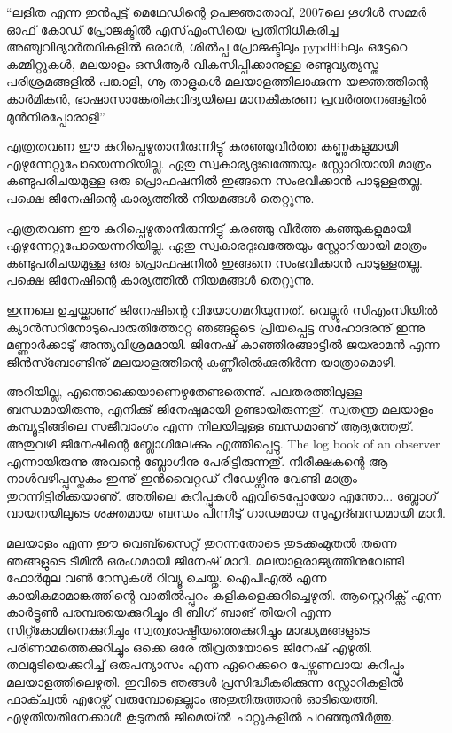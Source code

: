 {\vskip 2pt}

\begin{framed}
``ലളിത എന്ന ഇന്‍പുട്ട് മെഥേഡിന്റെ ഉപജ്ഞാതാവ്, 2007ലെ ഗൂഗിള്‍ സമ്മര്‍ ഓഫ് കോഡ് പ്രോജക്ടില്‍ എസ്എംസിയെ 
പ്രതിനിധീകരിച്ച അഞ്ചുവിദ്യാര്‍ത്ഥികളില്‍ ഒരാള്‍, ശില്‍പ്പ പ്രോജക്ടിലും pypdflibലും ഒട്ടേറെ കമ്മിറ്റുകള്‍, മലയാളം ഒസിആര്‍ 
വികസിപ്പിക്കാനുള്ള രണ്ടുവ്യത്യസ്ത പരിശ്രമങ്ങളില്‍ പങ്കാളി, ഗ്നൂ താളുകള്‍ മലയാളത്തിലാക്കുന്ന യജ്ഞത്തിന്റെ കാര്‍മികന്‍, 
ഭാഷാസാങ്കേതികവിദ്യയിലെ മാനകീകരണ പ്രവര്‍ത്തനങ്ങളില്‍ മുന്‍നിരപ്പോരാളി''
\end{framed}

{\vskip 12pt}

എത്രതവണ ഈ കുറിപ്പെഴുതാനിരുന്നിട്ടു് കരഞ്ഞുവീര്‍ത്ത കണ്ണുകളുമായി എഴുന്നേറ്റുപോയെന്നറിയില്ല. ഏതു സ്വകാര്യദുഃഖത്തേയും 
സ്റ്റോറിയായി മാത്രം കണ്ടുപരിചയമുള്ള ഒരു പ്രൊഫഷനില്‍ ഇങ്ങനെ സംഭവിക്കാന്‍ പാടുള്ളതല്ല. പക്ഷെ ജിനേഷിന്റെ 
കാര്യത്തില്‍ നിയമങ്ങള്‍ തെറ്റുന്നു.

എത്രതവണ ഈ കുറിപ്പെഴുതാനിരുന്നിട്ടു് കരഞ്ഞു വീർത്ത കഞ്ഞുകളുമായി എഴുന്നേറ്റുപോയെന്നറിയില്ല. ഏതു സ്വകാരദുഃഖത്തേയും
സ്റ്റോറിയായി മാത്രം കണ്ടുപരിചയമുള്ള ഒരു പ്രൊഫഷനിൽ ഇങ്ങനെ സംഭവിക്കാൻ പാടുള്ളതല്ല. പക്ഷെ ജിനേഷിന്റെ കാര്യത്തിൽ നിയമങ്ങൾ തെറ്റുന്നു.

ഇന്നലെ ഉച്ചയ്ക്കാണു് ജിനേഷിന്റെ വിയോഗമറിയുന്നത്. വെല്ലൂര്‍ സിഎംസിയില്‍ ക്യാന്‍സറിനോടുപൊരുതിത്തോറ്റ ഞങ്ങളുടെ 
പ്രിയപ്പെട്ട സഹോദരനു് ഇന്നു മണ്ണാര്‍ക്കാടു് അന്ത്യവിശ്രമമായി. ജിനേഷ് കാഞ്ഞിരങ്ങാട്ടില്‍ ജയരാമന്‍ എന്ന ജിന്‍സ്ബോണ്ടിനു്
മലയാളത്തിന്റെ കണ്ണീരില്‍ക്കുതിര്‍ന്ന യാത്രാമൊഴി.

അറിയില്ല, എന്തൊക്കെയാണെഴുതേണ്ടതെന്നു്. പലതരത്തിലുള്ള ബന്ധമായിരുന്നു, എനിക്കു് ജിനേഷുമായി ഉണ്ടായിരുന്നതു്. 
സ്വതന്ത്ര മലയാളം കമ്പ്യൂട്ടിങ്ങിലെ സജീവാംഗം എന്ന നിലയിലുള്ള ബന്ധമാണു് ആദ്യത്തേതു്. അതുവഴി ജിനേഷിന്റെ 
ബ്ലോഗിലേക്കും എത്തിപ്പെട്ടു. The log book of an observer എന്നായിരുന്നു അവന്റെ ബ്ലോഗിനു പേരിട്ടിരുന്നതു്. നിരീക്ഷകന്റെ 
ആ നാള്‍വഴിപ്പുസ്തകം ഇന്നു് ഇന്‍വൈറ്റഡ് റീഡേഴ്സിനു വേണ്ടി മാത്രം തുറന്നിട്ടിരിക്കയാണു്. അതിലെ കുറിപ്പുകള്‍ 
എവിടെപ്പോയോ എന്തോ... ബ്ലോഗ് വായനയിലൂടെ ശക്തമായ ബന്ധം പിന്നീടു് ഗാഢമായ സുഹൃദ്ബന്ധമായി മാറി.

മലയാളം എന്ന ഈ വെബ്സൈറ്റ് തുറന്നതോടെ തുടക്കംമുതല്‍ തന്നെ ഞങ്ങളുടെ ടീമില്‍ ഒരംഗമായി ജിനേഷ് മാറി. 
മലയാളരാജ്യത്തിനുവേണ്ടി ഫോര്‍മുല വണ്‍ റേസുകള്‍ റിവ്യൂ ചെയ്തു. ഐപിഎല്‍ എന്ന കായികമാമാങ്കത്തിന്റെ വാതില്‍പ്പുറം 
കളികളെക്കുറിച്ചെഴുതി. ആസ്റ്റെറിക്സ് എന്ന കാര്‍ട്ടൂണ്‍ പരമ്പരയെക്കുറിച്ചും ദി ബിഗ് ബാങ് തിയറി എന്ന സിറ്റ്കോമിനെക്കുറിച്ചും 
സ്വത്വരാഷ്ട്രീയത്തെക്കുറിച്ചും മാദ്ധ്യമങ്ങളുടെ പരിണാമത്തെക്കുറിച്ചും ഒക്കെ ഒരേ തീവ്രതയോടെ ജിനേഷ് എഴുതി. തലമുടിയെക്കുറിച്ച് 
ഒരുപന്യാസം എന്ന ഏറെക്കുറെ പേഴ്സണലായ കുറിപ്പും മലയാളത്തിലെഴുതി. ഇവിടെ ഞങ്ങള്‍ പ്രസിദ്ധീകരിക്കുന്ന സ്റ്റോറികളില്‍ 
ഫാക്ച്വല്‍ എറേഴ്സ് വരുമ്പോളെല്ലാം അതുതിരുത്താന്‍ ഓടിയെത്തി. എഴുതിയതിനേക്കാള്‍ കൂടുതല്‍ ജിമെയ്ല്‍ ചാറ്റുകളില്‍ 
പറഞ്ഞുതീര്‍ത്തു.

